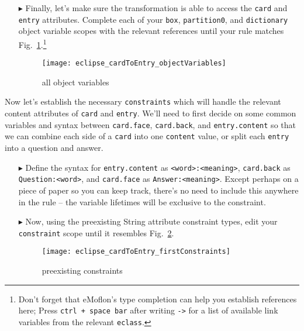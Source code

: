 \begin{itemize}
\vspace{0.5cm}

\item[$\blacktriangleright$] Finally, let's make sure the transformation is able to access the \texttt{card} and \texttt{entry} attributes. Complete each
of your \texttt{box}, \texttt{partition0}, and \texttt{dictionary} object variable scopes with the relevant references until your rule matches
Fig.~\ref{eclipse:c2eAllReferences}.\footnote{Don't forget that eMoflon's type completion can help you establish references here; Press \texttt{ctrl + space
bar} after writing \texttt{->} for a list of available link variables from the relevant \texttt{eclass}.}

\newpage

\begin{figure}[htb]
\begin{center}
  \texttt{[image: eclipse\_cardToEntry\_objectVariables]}
  \caption{all object variables}
  \label{eclipse:c2eAllReferences}
\end{center}
\end{figure}

\end{itemize}

Now let's establish the necessary \texttt{constraints} which will handle the relevant content attributes of \texttt{card} and \texttt{entry}. We'll need to
first decide on some common variables and syntax between \texttt{card.face}, \texttt{card.back}, and \texttt{entry.content} so that we can combine each side of
a \texttt{card} into one \texttt{content} value, or split each \texttt{entry} into a question and answer. 

\begin{itemize}

\item[$\blacktriangleright$] Define the syntax for \texttt{entry.content} as \texttt{<word>:<meaning>}, \texttt{card.back} as \texttt{Question:<word>}, and
\texttt{card.face} as \texttt{Answer:<meaning>}. Except perhaps on a piece of paper so you can keep track, there's no need to include this anywhere in the rule
-- the variable lifetimes will be exclusive to the constraint.

\vspace{0.5cm}

\item[$\blacktriangleright$] Now, using the preexisting String attribute constraint types, edit your \texttt{constraint} scope until it resembles
Fig.~\ref{eclipse:contentConstraints}.

\begin{figure}[htbp]
\begin{center}
  \texttt{[image: eclipse\_cardToEntry\_firstConstraints]}
  \caption{preexisting constraints}
  \label{eclipse:contentConstraints}
\end{center}
\end{figure}

\end{itemize}

